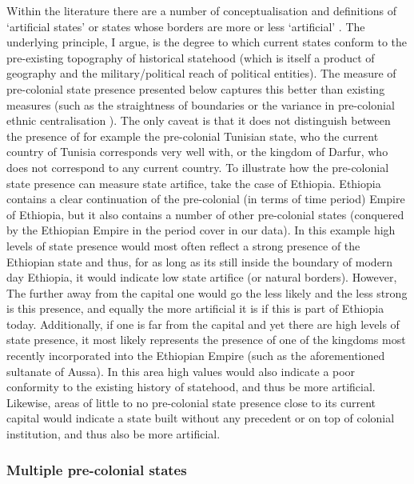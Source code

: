 \documentclass[12pt]{article}
\begin{document}
Within the literature there are a number of conceptualisation and definitions of
`artificial states' or states whose borders are more or less `artificial'
\citep{Alesina2011, Clapham1996, Englebert2002, Herbst2014}. The underlying
principle, I argue, is the degree to which current states conform to the
pre-existing topography of historical statehood (which is itself a product of
geography and the military/political reach of political entities). The measure
of pre-colonial state presence presented below captures this better than
existing measures (such as the straightness of boundaries \citep{Alesina2011} or
the variance in pre-colonial ethnic centralisation \citep{Englebert2002}). The
only caveat is that it does not distinguish between the presence of for example
the pre-colonial Tunisian state, who the current country of Tunisia corresponds
very well with, or the kingdom of Darfur, who does not correspond to any current
country. To illustrate how the pre-colonial state presence can measure state
artifice, take the case of Ethiopia. Ethiopia contains a clear continuation of
the pre-colonial (in terms of time period) Empire of Ethiopia, but it also
contains a number of other pre-colonial states (conquered by the Ethiopian
Empire in the period cover in our data). In this example high levels of state
presence would most often reflect a strong presence of the Ethiopian state and
thus, for as long as its still inside the boundary of modern day Ethiopia, it
would indicate low state artifice (or natural borders). However, The further
away from the capital one would go the less likely and the less strong is this
presence, and equally the more artificial it is if this is part of Ethiopia
today. Additionally, if one is far from the capital and yet there are high
levels of state presence, it most likely represents the presence of one of the
kingdoms most recently incorporated into the Ethiopian Empire (such as the
aforementioned sultanate of Aussa). In this area high values would also indicate
a poor conformity to the existing history of statehood, and thus be more
artificial.  Likewise, areas of little to no pre-colonial state presence close
to its current capital would indicate a state built without any precedent or on
top of colonial institution, and thus also be more artificial. 

\subsubsection{Multiple pre-colonial states}
\end{document}
